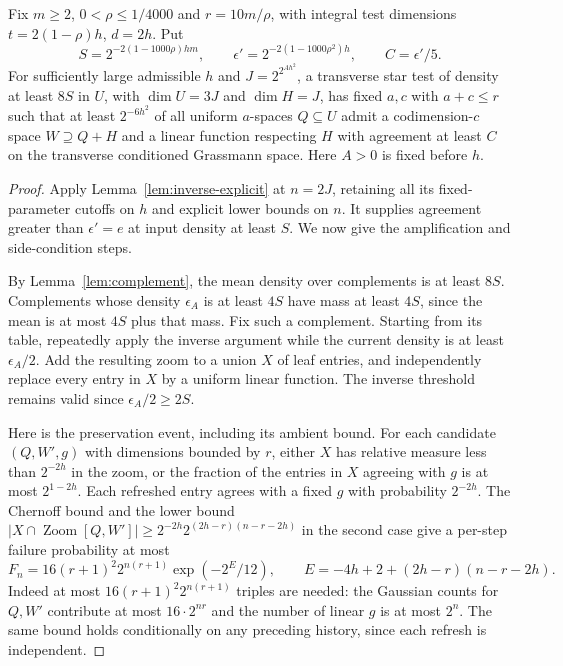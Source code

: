 \begin{lemma}\label{lem:robust-local}
Fix $m\ge2$, $0<\rho\le1/4000$ and $r=10m/\rho$, with integral test dimensions
$t=2(1-\rho)h$, $d=2h$. Put
\[
 S=2^{-2(1-1000\rho)hm},\qquad
 \epsilon'=2^{-2(1-1000\rho^2)h},\qquad C=\epsilon'/5.
\]
For sufficiently large admissible $h$ and $J=2^{2^{Ah^2}}$, a transverse
star test of density at least $8S$ in $U$, with $\dim U=3J$ and
$\dim H=J$, has fixed $a,c$ with $a+c\le r$ such that at least
$2^{-6h^2}$ of all uniform $a$-spaces $Q\subseteq U$ admit a
codimension-$c$ space $W\supseteq Q+H$ and a linear function respecting
$H$ with agreement at least $C$ on the transverse conditioned
Grassmann space. Here $A>0$ is fixed before $h$.
\end{lemma}
\begin{proof}
Apply Lemma~\ref{lem:inverse-explicit} at $n=2J$, retaining all its
fixed-parameter cutoffs on $h$ and explicit lower bounds on $n$.
It supplies agreement greater than $\epsilon'=e$ at input density
at least $S$. We now give the amplification and side-condition steps.

By Lemma~\ref{lem:complement}, the mean density over complements is
at least $8S$. Complements whose density $\epsilon_A$ is at least
$4S$ have mass at least $4S$, since the mean is at most $4S$ plus
that mass. Fix such a complement. Starting from its table, repeatedly
apply the inverse argument while the current density is at least
$\epsilon_A/2$. Add the resulting zoom to a union $X$ of leaf entries,
and independently replace every entry in $X$ by a uniform linear
function. The inverse threshold remains valid since
$\epsilon_A/2\ge2S$.

Here is the preservation event, including its ambient bound.
For each candidate $(Q,W',g)$ with dimensions bounded by $r$, either
$X$ has relative measure less than $2^{-2h}$ in the zoom, or the
fraction of the entries in $X$ agreeing with $g$ is at most
$2^{1-2h}$. Each refreshed entry agrees with a fixed $g$ with probability
$2^{-2h}$. The Chernoff bound and the lower bound
$|X\cap\operatorname{Zoom}[Q,W']|
 \ge2^{-2h}2^{(2h-r)(n-r-2h)}$
in the second case give a per-step failure probability at most
\[
 F_n=16(r+1)^2 2^{n(r+1)}
       \exp\!\left(-2^E/12\right),\qquad
 E=-4h+2+(2h-r)(n-r-2h).
\]
Indeed at most $16(r+1)^2 2^{n(r+1)}$ triples are needed: the Gaussian
counts for $Q,W'$ contribute at most $16\cdot2^{nr}$ and the number
of linear $g$ is at most $2^n$. The same bound holds conditionally on
any preceding history, since each refresh is independent.


\end{proof}
